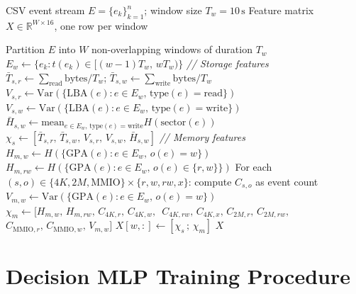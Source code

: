 \documentclass[journal]{IEEEtran}
\newcommand{\R}{\mathbb{R}}
\begin{document}
\begin{algorithm}[h]
\caption{16-dimensional behavioural feature extraction}
\label{alg:features}
\begin{algorithmic}[1]
\Require CSV event stream $E = \{e_k\}_{k=1}^{n}$; window size
  $T_w{=}10\,\text{s}$
\Ensure Feature matrix $X \in \R^{W \times 16}$, one row per window

\State Partition $E$ into $W$ non-overlapping windows of duration $T_w$
  \State $E_w \gets \{e_k : t(e_k) \in [(w{-}1)T_w,\, wT_w)\}$
  \State \textit{// Storage features}
  \State $\bar{T}_{s,r} \gets \sum_{\text{read}} \text{bytes}/T_w$;
         $\bar{T}_{s,w} \gets \sum_{\text{write}} \text{bytes}/T_w$
  \State $V_{s,r} \gets \text{Var}(\{\text{LBA}(e) : e \in E_w,\,
         \text{type}(e){=}\text{read}\})$
  \State $V_{s,w} \gets \text{Var}(\{\text{LBA}(e) : e \in E_w,\,
         \text{type}(e){=}\text{write}\})$
  \State $\bar{H}_{s,w} \gets \text{mean}_{e \in E_w,\,\text{type}(e){=}\text{write}}
         H(\text{sector}(e))$
  \State $\chi_s \gets [\bar{T}_{s,r},\, \bar{T}_{s,w},\, V_{s,r},\,
         V_{s,w},\, \bar{H}_{s,w}]$ 
  \State \textit{// Memory features}
  \State $H_{m,w} \gets H(\{\text{GPA}(e) : e \in E_w,\, o(e){=}w\})$
  \State $H_{m,rw} \gets H(\{\text{GPA}(e) : e \in E_w,\,
         o(e) \in \{r,w\}\})$
  \State For each $(s, o) \in \{4K,2M,\text{MMIO}\} \times \{r,w,rw,x\}$:
         compute $C_{s,o}$ as event count
  \State $V_{m,w} \gets \text{Var}(\{\text{GPA}(e) : e \in E_w,\,
         o(e){=}w\})$
  \State $\chi_m \gets [H_{m,w},\, H_{m,rw},\, C_{4K,r},\, C_{4K,w},\,$
  \Statex \hspace{3.2em}$C_{4K,rw},\, C_{4K,x},\, C_{2M,r},\, C_{2M,rw},$
  \Statex \hspace{3.2em}$C_{\text{MMIO},r},\, C_{\text{MMIO},w},\, V_{m,w}]$
  \State $X[w, :] \gets [\chi_s \,;\, \chi_m]$
         \hfill{}
\EndFor
\State \Return $X$
\end{algorithmic}
\end{algorithm}

\section{Decision MLP Training Procedure}\label{sec:supp_mlp}
\end{document}
